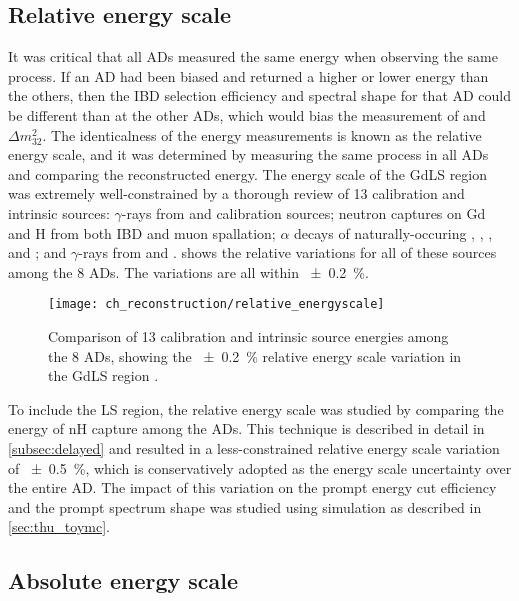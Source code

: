 \subsection{Relative energy scale}
\label{subsec:rel_energyscale}

It was critical that all ADs measured the same energy when observing the same process.
If an AD had been biased and returned a higher or lower energy than the others,
then the IBD selection efficiency and spectral shape for that AD
could be different than at the other ADs,
which would bias the measurement of \thetaot{} and $\Delta m^2_{32}$.
The identicalness of the energy measurements is known as the relative energy scale,
and it was determined by measuring the same process in all ADs and comparing
the reconstructed energy.
The energy scale of the GdLS region was extremely well-constrained
by a thorough review of 13 calibration and intrinsic sources:
$\gamma$-rays from  and  calibration sources;
neutron captures on Gd and H from both IBD and muon spallation;
$\alpha$ decays of naturally-occuring ,
, , and ;
and $\gamma$-rays from  and  \cite{ngd2016}.
 shows the relative variations
for all of these sources among the 8 ADs.
The variations are all within \SI{+-0.2}{\percent}.

\begin{figure}
    \centering
    \texttt{[image: ch\_reconstruction/relative\_energyscale]}
    \caption[Relative energy scale for GdLS volume]{
        Comparison of 13 calibration and intrinsic source energies
        among the 8 ADs, showing the \SI{+-0.2}{\percent}
        relative energy scale variation in the GdLS region
        \cite{ngd2016}.
    }
    \label{fig:gdls_rel_energyscale}
\end{figure}

To include the LS region, the relative energy scale was studied
by comparing the energy of nH capture among the ADs.
This technique is described in detail in \cref{subsec:delayed}
and resulted in a less-constrained relative energy scale variation
of \SI{+-0.5}{\percent}, which is conservatively adopted
as the energy scale uncertainty over the entire AD.
The impact of this variation on the prompt energy cut efficiency
and the prompt spectrum shape
was studied using simulation
as described in \cref{sec:thu_toymc}.

\subsection{Absolute energy scale}
\label{subsec:abs_energyscale}

